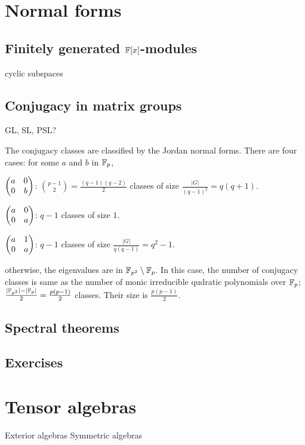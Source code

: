 \documentclass{../note}
\begin{document}
\chapter{Normal forms}
\section{Finitely generated $\mathbb{F}[x]$-modules}
cyclic subspaces

\section{Conjugacy in matrix groups}
GL, SL, PSL? %

\begin{prb}
The conjugacy classes are classified by the Jordan normal forms.
There are four cases: for some $a$ and $b$ in $\mathbb{F}_p$,
\begin{parts}
\item $\begin{pmatrix}a&0\\0&b\end{pmatrix}$: $\binom{p-1}2=\frac{(q-1)(q-2)}2$ classes of size $\frac{|G|}{(q-1)^2}=q(q+1)$.
\item $\begin{pmatrix}a&0\\0&a\end{pmatrix}$: $q-1$ classes of size $1$.
\item $\begin{pmatrix}a&1\\0&a\end{pmatrix}$: $q-1$ classes of size $\frac{|G|}{q(q-1)}=q^2-1$.
\item otherwise, the eigenvalues are in $\mathbb{F}_{p^2}\setminus\mathbb{F}_p$.
In this case, the number of conjugacy classes is same as the number of monic irreducible qudratic polynomials over $\mathbb{F}_p$; $\frac{|\mathbb{F}_{p^2}|-|\mathbb{F}_p|}2=\frac{p(p-1)}2$ classes.
Their size is $\frac{p(p-1)}2$.
\end{parts}
\end{prb}

\section{Spectral theorems}



\section*{Exercises}


\chapter{Tensor algebras}
Exterior algebras
Symmetric algebras
\end{document}
